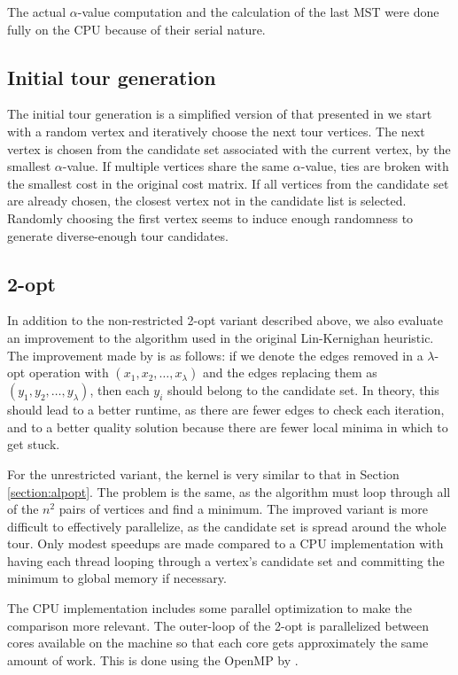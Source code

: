 \documentclass[english, 12pt, a4paper, sci, utf8, a-1b, online]{aaltothesis}
\begin{document}
The actual $\alpha$-value computation and the calculation of the last MST were done fully on the CPU because of their serial nature.

\subsection{Initial tour generation} \label{section:tourgen}
The initial tour generation is a simplified version of that presented in \cite{HELSGAUN2000106} we start with a random vertex and iteratively choose the next tour vertices. The next vertex is chosen from the candidate set associated with the current vertex, by the smallest $\alpha$-value. If multiple vertices share the same $\alpha$-value, ties are broken with the smallest cost in the original cost matrix. If all vertices from the candidate set are already chosen, the closest vertex not in the candidate list is selected. Randomly choosing the first vertex seems to induce enough randomness to generate diverse-enough tour candidates.

\subsection{2-opt}
In addition to the non-restricted 2-opt variant described above, we also evaluate an improvement to the algorithm used in the original Lin-Kernighan heuristic. The improvement made by \cite{linkernighan} is as follows: if we denote the edges removed in a $\lambda$-opt operation with $(x_1, x_2, \ldots, x_{\lambda})$ and the edges replacing them as $(y_1, y_2, \ldots, y_{\lambda})$, then each $y_i$ should belong to the candidate set. In theory, this should lead to a better runtime, as there are fewer edges to check each iteration, and to a better quality solution because there are fewer local minima in which to get stuck.

For the unrestricted variant, the kernel is very similar to that in Section \ref{section:alpopt}. The problem is the same, as the algorithm must loop through all of the $n^2$ pairs of vertices and find a minimum. The improved variant is more difficult to effectively parallelize, as the candidate set is spread around the whole tour. Only modest speedups are made compared to a CPU implementation with having each thread looping through a vertex's candidate set and committing the minimum to global memory if necessary. 

The CPU implementation includes some parallel optimization to make the comparison more relevant. The outer-loop of the 2-opt is parallelized between cores available on the machine so that each core gets approximately the same amount of work. This is done using the OpenMP by \cite{openmp}. 
\end{document}
